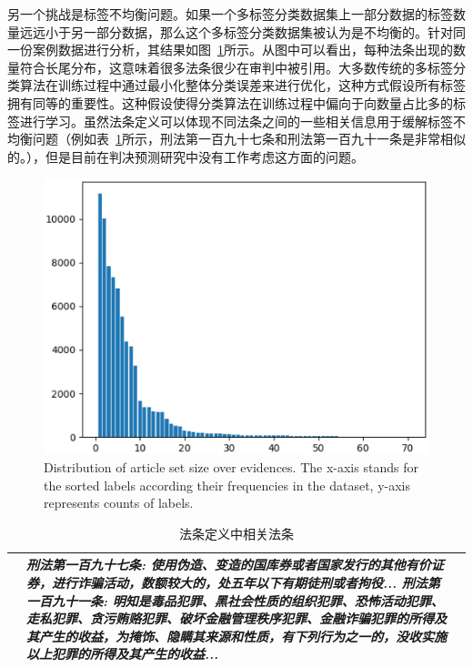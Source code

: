 另一个挑战是标签不均衡问题。如果一个多标签分类数据集上一部分数据的标签数量远远小于另一部分数据，那么这个多标签分类数据集被认为是不均衡的。针对同一份案例数据进行分析，其结果如图~\ref{fig:tail}所示。从图中可以看出，每种法条出现的数量符合长尾分布，这意味着很多法条很少在审判中被引用。大多数传统的多标签分类算法在训练过程中通过最小化整体分类误差来进行优化，这种方式假设所有标签拥有同等的重要性。这种假设使得分类算法在训练过程中偏向于向数量占比多的标签进行学习。虽然法条定义可以体现不同法条之间的一些相关信息用于缓解标签不均衡问题（例如表~\ref{t:relevant_article}所示，刑法第一百九十七条和刑法第一百九十一条是非常相似的。），但是目前在判决预测研究中没有工作考虑这方面的问题。

\begin{figure}[t!]
\centering
\includegraphics[scale=0.5,clip=true]{./sources/2.eps}
\caption{\label{fig:tail}Distribution of article set size over evidences. The x-axis stands for the sorted labels according their frequencies in the dataset, y-axis represents counts of labels.}
\end{figure}



\begin{table}[t!]
    \caption{法条定义中相关法条}
    \label{t:relevant_article}
    \centering
    \begin{tabular}{lp{12cm}p{7cm}}
    \hline
    &\emph{\textbf{刑法第一百九十七条}: 使用伪造、变造的国库券或者国家发行的其他有价证券，进行\emph{\textbf{诈骗}}活动，数额较大的，处五年以下有期徒刑或者拘役... \newline
    \textbf{刑法第一百九十一条}: 明知是毒品犯罪、黑社会性质的组织犯罪、恐怖活动犯罪、走私犯罪、贪污贿赂犯罪、破坏金融管理秩序犯罪、\emph{\textbf{金融诈骗}}犯罪的所得及其产生的收益，为掩饰、隐瞒其来源和性质，有下列行为之一的，没收实施以上犯罪的所得及其产生的收益...}\\
    \hline
    \end{tabular}
\end{table}

